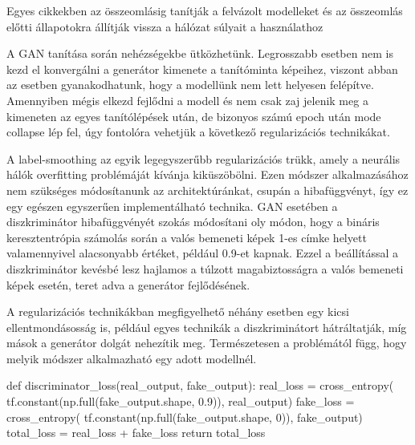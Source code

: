 Egyes cikkekben az összeomlásig tanítják a felvázolt modelleket és az összeomlás előtti állapotokra állítják vissza a hálózat súlyait a használathoz \cite{brock2018large}


A GAN tanítása során nehézségekbe ütközhetünk. Legrosszabb esetben nem is kezd el konvergálni a generátor kimenete a tanítóminta képeihez, viszont abban az esetben gyanakodhatunk, hogy a modellünk nem lett helyesen felépítve. Amennyiben mégis elkezd fejlődni a modell és nem csak zaj jelenik meg a kimeneten az egyes tanítólépések után, de bizonyos számú epoch után mode collapse lép fel, úgy fontolóra vehetjük a következő regularizációs technikákat.

A label-smoothing az egyik legegyszerűbb regularizációs trükk, amely a neurális hálók overfitting problémáját kívánja kiküszöbölni. Ezen módszer alkalmazásához nem szükséges módosítanunk az architektúránkat, csupán a hibafüggvényt, így ez egy egészen egyszerűen implementálható technika. GAN esetében a diszkriminátor hibafüggvényét szokás módosítani oly módon, hogy a bináris keresztentrópia számolás során a valós bemeneti képek 1-es címke helyett valamennyivel alacsonyabb értéket, például 0.9-et kapnak. Ezzel a beállítással a diszkriminátor kevésbé lesz hajlamos a túlzott magabiztosságra a valós bemeneti képek esetén, teret adva a generátor fejlődésének.

A regularizációs technikákban megfigyelhető néhány esetben egy kicsi ellentmondásosság is, például egyes technikák a diszkriminátort hátráltatják, míg mások a generátor dolgát nehezítik meg. Természetesen a problémától függ, hogy melyik módszer alkalmazható egy adott modellnél.

\begin{python}
def discriminator_loss(real_output, fake_output):
    real_loss = cross_entropy(
	    tf.constant(np.full(fake_output.shape, 0.9)),
	    real_output)
    fake_loss = cross_entropy(
	    tf.constant(np.full(fake_output.shape, 0)),
	    fake_output)
    total_loss = real_loss + fake_loss
    return total_loss
\end{python}



